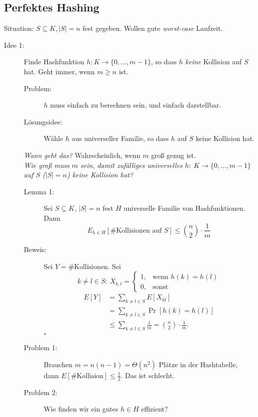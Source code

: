 \subsection{Perfektes Hashing}
Situation: $S \subseteq K, |S| = n$ fest gegeben. Wollen gute \emph{worst-case} Laufzeit.
\begin{description}
 \item[Idee 1:] Finde Hashfunktion $h{:} K \to \{0, ..., m-1\}$, so dass $h$ \emph{keine} Kollision auf $S$ hat. Geht immer, wenn $m \geq n$ ist.
 \begin{description}
  \item[Problem:] $h$ muss einfach zu berechnen sein, und einfach darstellbar.
  \item[Lösungsidee:] Wähle $h$ aus universeller Familie, so dass $h$ auf $S$ keine Kollision hat.
 \end{description}
 \emph{Wann geht das?} Wahrscheinlich, wenn $m$ groß genug ist. \\
 \emph{Wie groß muss $m$ sein, damit zufälliges universelles $h{:}\ K \to \{0,...,m-1\}$ auf $S$ ($|S| = n$) keine Kollision hat?}
 \begin{description}
  \item[Lemma 1:] Sei $S \subseteq K$, $|S| = n$ fest $H$ universelle Familie von Hashfunktionen. Dann
      \[E_{h \in H}[\#\text{Kollisionen auf $S$}] \leq \binom{n}{2} \cdot \frac{1}{m}\]
  \item[Beweis:] Sei $Y = \#\text{Kollisionen}$. Sei 
      \[k \neq l \in S{:}\ X_{k,l} = \begin{cases}1, & \text{wenn $h(k) = h(l)$}\\ 0, & \text{sonst}\end{cases}\]
      \begin{align*}
      E[Y]   &= \sum\limits_{k \neq l \in S} E[X_{kl}] \\
             &= \sum\limits_{k \neq l \in S} \operatorname{Pr}[h(k) = h(l)] \\
             &\leq \sum\limits_{k \neq l \in S} \frac{1}{m} = \binom{n}{2} \cdot \frac{1}{m}.  
      \end{align*} \hfill $\square$
  \item[Problem 1:] Brauchen $m = n(n-1) = \Theta(n^2)$ Plätze in der Hashtabelle, dann $E[\#\text{Kollision}] \leq \frac{1}{2}$. Das ist schlecht.
  \item[Problem 2:] Wie finden wir ein gutes $h \in H$ effizient?
 \end{description}
 \begin{description}

\end{description}
\end{description}

